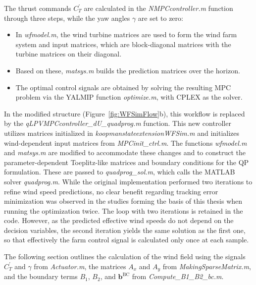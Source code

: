 %
The thrust commands $C^{\prime}_T$ are calculated in the \textit{NMPCcontroller.m} function through three steps, while the yaw angles $\gamma$ are set to zero:
\begin{itemize}
    \item In \textit{wfmodel.m}, the wind turbine matrices are used to form the wind farm system and input matrices, which are block-diagonal matrices with the turbine matrices on their diagonal.
    \item Based on these, \textit{matsys.m} builds the prediction matrices over the horizon.
    \item The optimal control signals are obtained by solving the resulting MPC problem via the YALMIP function \textit{optimize.m}, with CPLEX as the solver.
\end{itemize}
%
In the modified structure (Figure~\ref{fig:WFSimFlow}b), this workflow is replaced by the \textit{qLPVMPCcontroller\_dU\_\allowbreak quadprog.m} function. This new controller utilizes matrices initialized in \textit{koopmanstateextensionWFSim.m} and initializes wind-dependent input matrices from \textit{MPCinit\_ctrl.m}. The functions \textit{wfmodel.m} and \textit{matsys.m} are modified to accommodate these changes and to construct the parameter-dependent Toeplitz-like matrices and boundary conditions for the QP formulation. These are passed to \textit{quadprog\_sol.m}, which calls the MATLAB solver \textit{quadprog.m}. While the original implementation performed two iterations to refine wind speed predictions, no clear benefit regarding tracking error minimization was observed in the studies forming the basis of this thesis when running the optimization twice. The loop with two iterations is retained in the code. However, as the predicted effective wind speeds do not depend on the decision variables, the second iteration yields the same solution as the first one, so that effectively the farm control signal is calculated only once at each sample.

The following section outlines the calculation of the wind field using the signals $C^{\prime}_T$ and $\gamma$ from \textit{Actuator.m}, the matrices $A_x$ and $A_y$ from \textit{MakingSparseMatrix.m}, and the boundary terms $B_1$, $B_2$, and $\bm{b}^\mathrm{BC}$ from \textit{Compute\_B1\_B2\_bc.m}.

